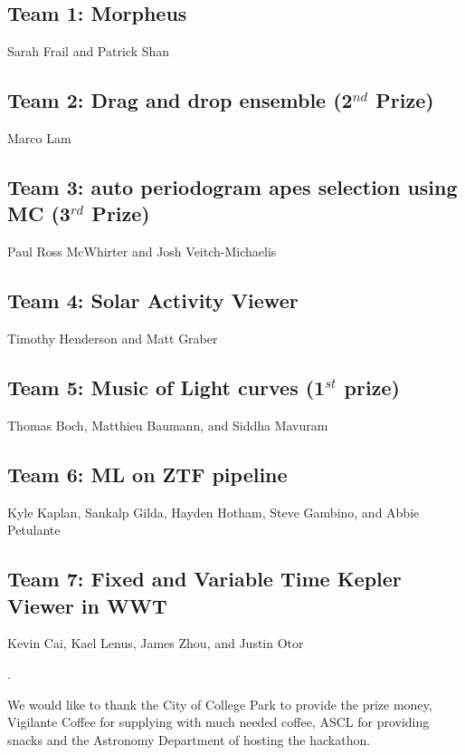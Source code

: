 \documentclass[11pt,twoside]{article}
\begin{document}
\subsection*{Team 1: Morpheus}
Sarah Frail and Patrick Shan

\subsection*{Team 2: Drag and drop ensemble (2$^{nd}$ Prize)}
Marco Lam

\subsection*{Team 3: auto periodogram apes selection using MC (3$^{rd}$ Prize)}

Paul Ross McWhirter and Josh Veitch-Michaelis

\subsection*{Team 4: Solar Activity Viewer}

Timothy Henderson and Matt Graber

\subsection*{Team 5: Music of Light curves (1$^{st}$ prize)}

Thomas Boch, Matthieu Baumann, and Siddha Mavuram


\subsection*{Team 6: ML on ZTF pipeline}


Kyle Kaplan, Sankalp Gilda, Hayden Hotham, Steve Gambino, and Abbie Petulante


\subsection*{Team 7: Fixed and Variable Time Kepler Viewer in WWT}

Kevin Cai, Kael Lenus, James Zhou, and Justin Otor


\citep{foo}.

\acknowledgements We would like to thank the City of College Park to
provide the prize money, Vigilante Coffee for supplying with much
needed coffee, ASCL for providing snacks and the Astronomy Department
of hosting the hackathon.




%
\end{document}
